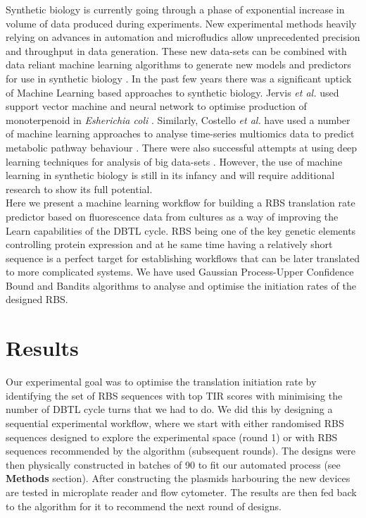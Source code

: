 \documentclass{article}
\begin{document}
Synthetic biology is currently going through a phase of exponential increase in volume of data produced during experiments. \cite{Freemont2019} New experimental methods heavily relying on advances in automation and microfludics allow unprecedented precision and throughput in data generation. These new data-sets can be combined with data reliant machine learning algorithms to generate new models and predictors for use in synthetic biology \cite{Camacho2018}. In the past few years there was a significant uptick of Machine Learning based approaches to synthetic biology. Jervis \emph{et al.} used support vector machine and neural network to optimise production of monoterpenoid in \emph{Esherichia coli} \cite{Jervis2019}. Similarly, Costello \emph{et al.} have used a number of machine learning approaches to analyse time-series multiomics data to predict metabolic pathway behaviour \cite{Costello2018}. There were also successful attempts at using deep learning techniques for analysis of big data-sets \cite{Alipanahi2015,Angermueller2016}. However, the use of machine learning in synthetic biology is still in its infancy and will require additional research to show its full potential. \\
Here we present a machine learning workflow for building a RBS translation rate predictor based on fluorescence data from cultures as a way of improving the Learn capabilities of the DBTL cycle. RBS being one of the key genetic elements controlling protein expression and at he same time having a relatively short sequence is a perfect target for establishing workflows that can be later translated to more complicated systems. We have used Gaussian Process-Upper Confidence Bound and Bandits algorithms to analyse and optimise the initiation rates of the designed RBS.



\section{Results}

Our experimental goal was to optimise the translation initiation rate by identifying the set of RBS sequences with top TIR scores with minimising the number of DBTL cycle turns that we had to do. We did this by designing a sequential experimental workflow, where we start with either randomised RBS sequences designed to explore the experimental space (round 1) or with RBS sequences recommended by the algorithm (subsequent rounds). The designs were then physically constructed in batches of 90 to fit our automated process (see \textbf{Methods} section). After constructing the plasmids harbouring the new devices are tested in microplate reader and flow cytometer. The results are then fed back to the algorithm for it to recommend the next round of designs.\\
\end{document}
